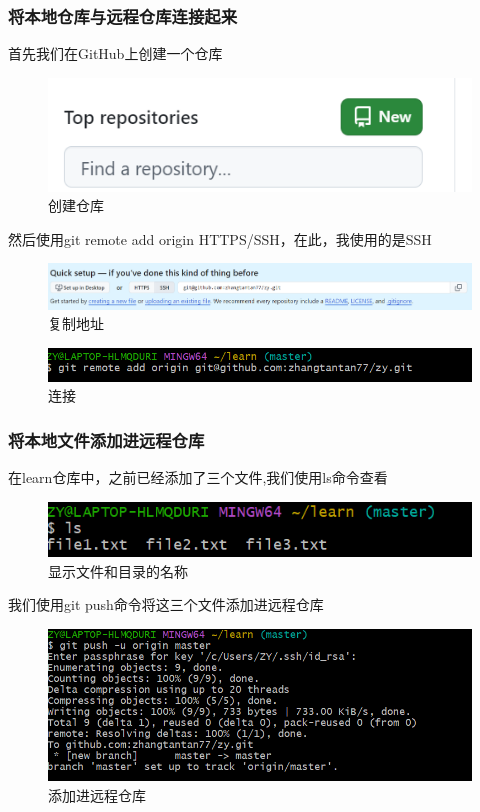 \documentclass{ctexart}
\begin{document}
	\subsubsection{将本地仓库与远程仓库连接起来}
	
	首先我们在GitHub上创建一个仓库
	\begin{figure}[H]
		\centering
		\includegraphics{12}
		\caption{创建仓库}
	\end{figure}
	然后使用git remote add origin HTTPS/SSH，在此，我使用的是SSH
	\begin{figure}[H]
		\centering
		\includegraphics{13}
		\caption{复制地址}
	\end{figure}
	
	\begin{figure}[H]
		\centering
		\includegraphics{14}
		\caption{连接}
	\end{figure}
	
	\subsubsection{将本地文件添加进远程仓库}
	在learn仓库中，之前已经添加了三个文件,我们使用ls命令查看
	\begin{figure}[H]
		\centering
		\includegraphics{16}
		\caption{显示文件和目录的名称}
	\end{figure}
	
	我们使用git push命令将这三个文件添加进远程仓库
	\begin{figure}[H]
		\centering
		\includegraphics{17}
		\caption{添加进远程仓库}
	\end{figure}
	
\end{document}
